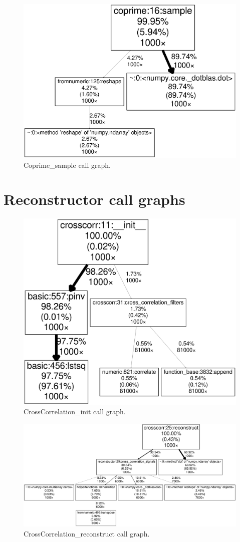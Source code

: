 \documentclass[a4paper, openany, oneside]{memoir}
\begin{document}
\begin{figure}[H]
    \centering
    \includegraphics[width=0.8\linewidth]{Coprime_sample}
    \caption{Coprime\_sample call graph.}
    \label{fig:Coprime_sample}
\end{figure}

\section{Reconstructor call graphs}
\label{sec:reconstructor_call_graphs}

\begin{figure}[H]
    \centering
    \includegraphics[width=0.8\linewidth]{CrossCorrelation_init}
    \caption{CrossCorrelation\_init call graph.}
    \label{fig:CrossCorrelation_init}
\end{figure}

\begin{figure}[H]
    \centering
    \includegraphics[width=0.8\linewidth]{CrossCorrelation_reconstruct}
    \caption{CrossCorrelation\_reconstruct call graph.}
    \label{fig:CrossCorrelation_reconstruct}
\end{figure}
\end{document}
